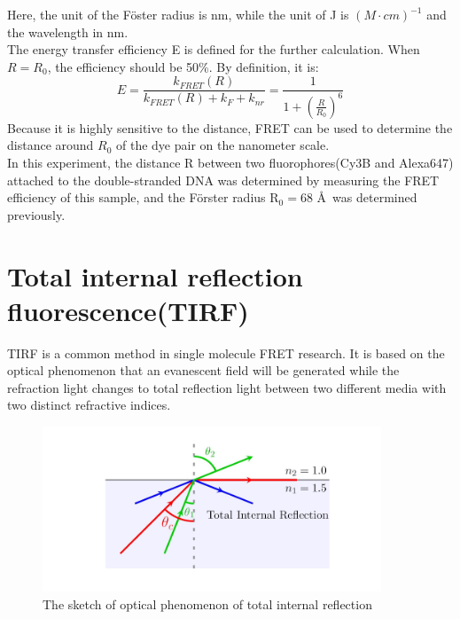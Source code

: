 \documentclass[a4paper,english,12pt,bibliography=totoc]{scrreprt}
\begin{document}
Here, the unit of the Föster radius is nm, while the unit of J is $(M \cdot cm)^{-1}$ and the wavelength in nm.\\

The energy transfer efficiency E is defined for the further calculation. When $R = R_0$, the efficiency should be 50\%. By definition, it is:
\[
E = \frac{k_{FRET}(R)}{k_{FRET}(R) + k_F + k_{nr}} = \frac{1}{1+(\frac{R}{R_0})^6}
\]
Because it is highly sensitive to the distance, FRET can be used to determine the distance around $R_0$ of the dye pair on the nanometer scale.\\

In this experiment, the distance R between two fluorophores(Cy3B and Alexa647) attached to the double-stranded DNA was determined by measuring the FRET efficiency of this sample, and the Förster radius $\mathrm{R_0} = 68$ \AA \ was determined previously.
\section{Total internal reflection fluorescence(TIRF)}
TIRF is a common method in single molecule FRET research. It is based on the optical phenomenon that an evanescent field will be generated while the refraction light changes to total reflection light between two different media with two distinct refractive indices.

\begin{figure}
    \centering
    \includegraphics[width = 0.9\textwidth]{images/TIRF.png}
    \caption{The sketch of optical phenomenon of total internal reflection}
\end{figure}
\end{document}
